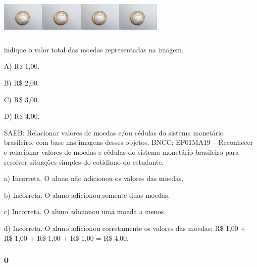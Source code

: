 \includegraphics[width=0.80577in,height=0.79447in]{media/image60.jpg}\includegraphics[width=0.80577in,height=0.79447in]{media/image60.jpg}\includegraphics[width=0.80577in,height=0.79447in]{media/image60.jpg}\includegraphics[width=0.80577in,height=0.79447in]{media/image60.jpg}

indique o valor total das moedas representadas na imagem.

A) R\$ 1,00.

B) R\$ 2,00.

C) R\$ 3,00.

D) R\$ 4,00.

SAEB: Relacionar valores de moedas e/ou cédulas do sistema
monetário brasileiro, com base nas imagens desses objetos.
BNCC: EF01MA19 -- Reconhecer e relacionar valores de moedas e cédulas do
sistema monetário brasileiro para resolver situações simples do
cotidiano do estudante.

a) Incorreta. O aluno não adicionou os valores das moedas.

b) Incorreta. O aluno adicionou somente duas moedas.

c) Incorreta. O aluno adicionou uma moeda a menos.

d) Incorreta. O aluno adicionou corretamente os valores das moedas:
R\$ 1,00 + R\$ 1,00 + R\$ 1,00 + R\$ 1,00 = R\$ 4,00.

\subsubsection{0}\label{section-111}

